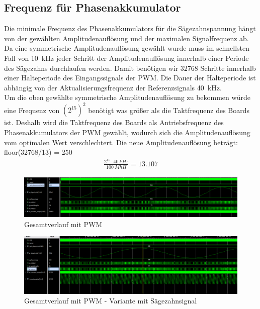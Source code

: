 \documentclass[a4paper,11pt,DIV=11,parskip=half]{scrartcl}
\begin{document}
\subsection{Frequenz für Phasenakkumulator}
Die minimale Frequenz des Phasenakkumulators für die Sägezahnspannung hängt von der gewählten Amplitudenauflösung und der maximalen Signalfrequenz ab. \\
Da eine symmetrische Amplitudenauflösung gewählt wurde muss im schnellsten Fall von \SI{10}{kHz} jeder Schritt der Amplitudenauflösung innerhalb einer Periode des Sägezahns durchlaufen werden.
Damit benötigen wir 32768 Schritte innerhalb einer Halteperiode des Eingangssignals der PWM. Die Dauer der Halteperiode ist abhängig von der Aktualisierungsfrequenz der Referenzsignals \SI{40}{kHz}. \\ Um die oben gewählte symmetrische Amplitudenauflösung zu bekommen würde eine Frequenz von $(2^{15})^2$ benötigt was größer als die Taktfrequenz des Boards ist. Deshalb wird die Taktfrequenz des Boards als Antriebsfrequenz des Phasenakkumulators der PWM gewählt, wodurch sich die Amplitudenauflösung vom optimalen Wert verschlechtert. 
Die neue Amplitudenauflösung beträgt: floor(32768/13) = 250 \\
\begin{align}
	\frac{2^{15}\cdot \SI{40}{kHz}}{\SI{100}{MhH}} = 13.107
\end{align}
\begin{figure}[H]
	\centering
	\includegraphics[width=\textwidth]{Bilder/DDS_FULL_PWM.png}
	\caption{Gesamtverlauf mit PWM}
	\label{fig:tb_DDS_PWM}
\end{figure}
\begin{figure}[H]
	\centering
	\includegraphics[width=\textwidth]{Bilder/DDS_FULL_PWM2.png}
	\caption{Gesamtverlauf mit PWM - Variante mit Sägezahnsignal}
	\label{fig:tb_DDS_PWM2}
\end{figure}
\end{document}
